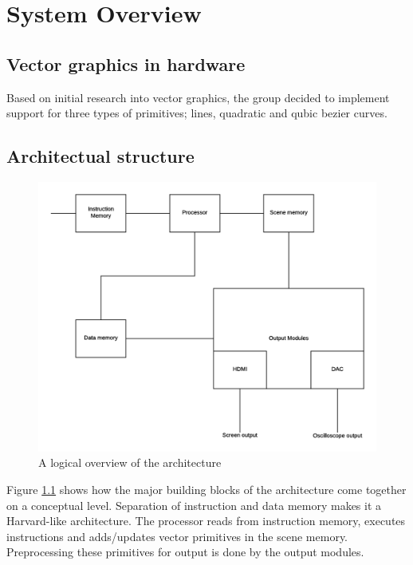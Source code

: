 \chapter{System Overview}

\section{Vector graphics in hardware}

Based on initial research into vector graphics, the group decided to implement support for three types of primitives; lines, quadratic and qubic bezier curves.

\section{Architectual structure}

\begin{figure}[h!]
    \includegraphics[width=\linewidth]{images/system-overview.png}
    \caption{A logical overview of the \vthreek architecture}
    \label{fig:system-overview}
\end{figure}

Figure \ref{fig:system-overview} shows how the major building blocks of the \vthreek architecture come together on a conceptual level.
Separation of instruction and data memory makes it a Harvard-like architecture.
The processor reads from instruction memory, executes instructions and adds/updates vector primitives in the scene memory.
Preprocessing these primitives for output is done by the output modules.

